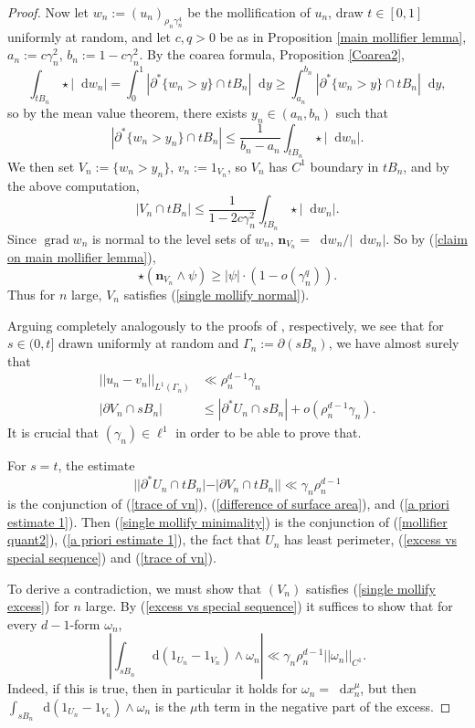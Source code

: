 \documentclass[reqno,11pt]{amsart}
\newcommand*\dif{\mathop{}\!\mathrm{d}}
\DeclareMathOperator{\grad}{grad}
\newcommand{\normal}{\mathbf n}
\theoremstyle{definition}
\numberwithin{equation}{section}
\begin{document}
\begin{proof}
Now let $w_n := (u_n)_{\rho_n \gamma_n^4}$ be the mollification of $u_n$, draw $t \in [0, 1]$ uniformly at random, and let $c, q > 0$ be as in Proposition \ref{main mollifier lemma}, $a_n := c\gamma_n^2$, $b_n := 1 - c\gamma_n^2$.
By the coarea formula, Proposition \ref{Coarea2},
$$\int_{tB_n} \star |\dif w_n| = \int_0^1 |\partial^* \{w_n > y\} \cap tB_n| \dif y \geq \int_{a_n}^{b_n} |\partial^* \{w_n > y\} \cap tB_n| \dif y,$$
so by the mean value theorem, there exists $y_n \in (a_n, b_n)$ such that
$$|\partial^* \{w_n > y_n\} \cap tB_n| \leq \frac{1}{b_n - a_n} \int_{tB_n} \star |\dif w_n|.$$
We then set $V_n := \{w_n > y_n\}$, $v_n := 1_{V_n}$, so $V_n$ has $C^1$ boundary in $tB_n$, and by the above computation,
\begin{equation}\label{MVT mollifier}
|V_n \cap tB_n| \leq \frac{1}{1 - 2c\gamma_n^2} \int_{tB_n} \star |\dif w_n|.
\end{equation}
Since $\grad w_n$ is normal to the level sets of $w_n$, $\normal_{V_n} = \dif w_n/|\dif w_n|$.
So by (\ref{claim on main mollifier lemma}),
$$\star(\normal_{V_n} \wedge \psi) \geq |\psi| \cdot (1 - o(\gamma_n^q)).$$
Thus for $n$ large, $V_n$ satisfies (\ref{single mollify normal}).

Arguing completely analogously to the proofs of \cite[(7.23), (7.22)]{Giusti77}, respectively, we see that
for $s \in (0, t]$ drawn uniformly at random and $\Gamma_n := \partial(sB_n)$, we have almost surely that
\begin{align}
||u_n - v_n||_{L^1(\Gamma_n)} &\ll \rho_n^{d - 1} \gamma_n \label{trace of vn} \\
|\partial V_n \cap sB_n| &\leq |\partial^* U_n \cap sB_n| + o(\rho_n^{d - 1} \gamma_n). \label{difference of surface area}
\end{align}
It is crucial that $(\gamma_n) \in \ell^1$ in order to be able to prove that.

For $s = t$, the estimate
\begin{equation}
||\partial^* U_n \cap tB_n| - |\partial V_n \cap tB_n|| \ll \gamma_n \rho_n^{d - 1} \label{mollifier quant2}
\end{equation}
is the conjunction of (\ref{trace of vn}), (\ref{difference of surface area}), and (\ref{a priori estimate 1}).
Then (\ref{single mollify minimality}) is the conjunction of (\ref{mollifier quant2}), (\ref{a priori estimate 1}), the fact that $U_n$ has least perimeter, (\ref{excess vs special sequence}) and (\ref{trace of vn}).

To derive a contradiction, we must show that $(V_n)$ satisfies (\ref{single mollify excess}) for $n$ large.
By (\ref{excess vs special sequence}) it suffices to show that for every $d-1$-form $\omega_n$,
\begin{equation}\label{mollifier quant3}
\left|\int_{sB_n} \dif(1_{U_n} - 1_{V_n}) \wedge \omega_n\right| \ll \gamma_n \rho_n^{d - 1} ||\omega_n||_{C^1}.
\end{equation}
Indeed, if this is true, then in particular it holds for $\omega_n = \dif x^\mu_n$, but then $\int_{sB_n} \dif(1_{U_n} - 1_{V_n}) \wedge \omega_n$ is the $\mu$th term in the negative part of the excess.


\end{proof}
\end{document}
